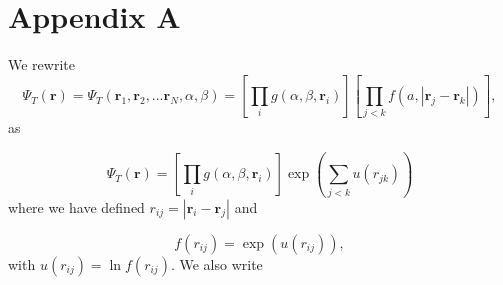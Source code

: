 \documentclass[11pt,a4paper,titlepage]{article}
\begin{document}
\section{Appendix A}\label{app_A}
We rewrite 
\begin{equation*}
\Psi_T(\mathbf{r})=\Psi_T(\mathbf{r}_1, \mathbf{r}_2, \dots \mathbf{r}_N,\alpha,\beta)
=\left[
    \prod_i g(\alpha,\beta,\mathbf{r}_i)
\right]
\left[
    \prod_{j<k}f(a,|\mathbf{r}_j-\mathbf{r}_k|)
\right],
\end{equation*}
as

\begin{equation*}
\Psi_T(\mathbf{r})=\left[
    \prod_i g(\alpha,\beta,\mathbf{r}_i)
\right]
\exp{\left(\sum_{j<k}u(r_{jk})\right)}
\end{equation*}
where we have defined $r_{ij}=|\mathbf{r}_i-\mathbf{r}_j|$
and

\begin{equation*}
   f(r_{ij})= \exp{\left(u(r_{ij})\right)},
\end{equation*}
with $u(r_{ij})=\ln{f(r_{ij})}$.
We also write
\end{document}

